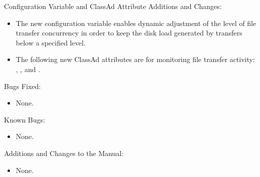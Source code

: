\noindent Configuration Variable and ClassAd Attribute Additions and Changes:

\begin{itemize}

\item The new configuration variable
 enables dynamic
adjustment of the level of file transfer concurrency in order to
keep the disk load generated by transfers below a specified level.

\item The following new  ClassAd attributes are for
monitoring file transfer activity:
,
, and
.

\end{itemize}

\noindent Bugs Fixed:

\begin{itemize}

\item None.

\end{itemize}

\noindent Known Bugs:

\begin{itemize}

\item None.

\end{itemize}

\noindent Additions and Changes to the Manual:

\begin{itemize}

\item None.

\end{itemize}


